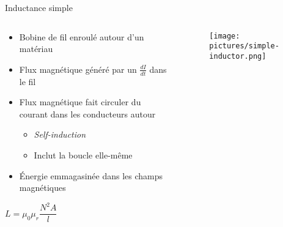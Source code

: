 \begin{frame}{Inductance simple}
    \begin{columns}
        \begin{column}{0.66\textwidth}
            \begin{itemize}
                \item Bobine de fil enroulé autour d'un matériau
                \item Flux magnétique généré par un $\frac{dI}{dt}$ dans le fil
                \item Flux magnétique fait circuler du courant dans les conducteurs autour
                \begin{itemize}
                    \item \textit{Self-induction}
                    \item Inclut la boucle elle-même
                \end{itemize}
                \item Énergie emmagasinée dans les champs magnétiques
            \end{itemize}
            \par
            \Large{
            \begin{center}
                $L = \mu_0 \mu_r \dfrac{N^2A}{l}$
            \end{center}
            }
        \end{column}

        \begin{column}{0.33\textwidth}
            \begin{figure}
                \centering
                \texttt{[image: pictures/simple-inductor.png]}
            \end{figure}
        \end{column}
    \end{columns}
\end{frame}


